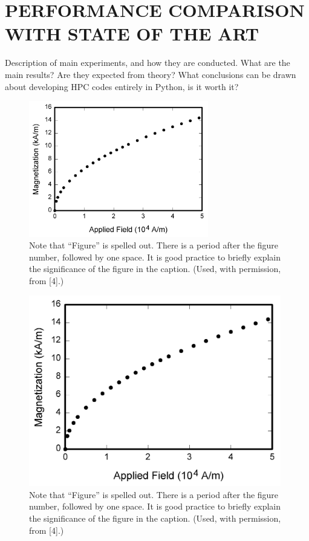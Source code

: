 \documentclass{IEEEcsmag}
\begin{document}
\section{PERFORMANCE COMPARISON WITH STATE OF THE ART}

Description of main experiments, and how they are conducted. What are the main results? Are they expected from theory? What conclusions can be drawn about developing HPC codes entirely in Python, is it worth it?


\begin{figure}
\centerline{\includegraphics[width=18.5pc]{figures/fig1.png}}
\caption{Note that ``Figure'' is spelled out. There is a period after the figure number, followed by one space. It is good practice to briefly explain the significance of the figure in the caption. (Used, with permission, from [4].)}
\end{figure}

\begin{figure}
\centerline{\includegraphics[width=26pc]{figures/fig1.png}}
\caption{Note that ``Figure'' is spelled out. There is a period after the figure number, followed by one space. It is good practice to briefly explain the significance of the figure in the caption. (Used, with permission, from [4].)}
\end{figure}
\end{document}
